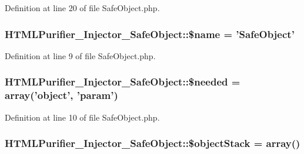 Definition at line 20 of file Safe\+Object.\+php.

\hypertarget{classHTMLPurifier__Injector__SafeObject_a84f42995caf73f2ce757e3f4b9170602}{
\subsubsection[{\$name}]{\setlength{\rightskip}{0pt plus 5cm}H\+T\+M\+L\+Purifier\+\_\+\+Injector\+\_\+\+Safe\+Object\+::\$name = 'Safe\+Object'}}\label{classHTMLPurifier__Injector__SafeObject_a84f42995caf73f2ce757e3f4b9170602}


Definition at line 9 of file Safe\+Object.\+php.

\hypertarget{classHTMLPurifier__Injector__SafeObject_ad361a1c14e9d819760f17572d1b74117}{
\subsubsection[{\$needed}]{\setlength{\rightskip}{0pt plus 5cm}H\+T\+M\+L\+Purifier\+\_\+\+Injector\+\_\+\+Safe\+Object\+::\$needed = array('object', 'param')}}\label{classHTMLPurifier__Injector__SafeObject_ad361a1c14e9d819760f17572d1b74117}


Definition at line 10 of file Safe\+Object.\+php.

\hypertarget{classHTMLPurifier__Injector__SafeObject_a46a5ffcba8ee5d55ff56ee5263925dcd}{
\subsubsection[{\$object\+Stack}]{\setlength{\rightskip}{0pt plus 5cm}H\+T\+M\+L\+Purifier\+\_\+\+Injector\+\_\+\+Safe\+Object\+::\$object\+Stack = array()\hspace{0.3cm}{\ttfamily [protected]}}}\label{classHTMLPurifier__Injector__SafeObject_a46a5ffcba8ee5d55ff56ee5263925dcd}



